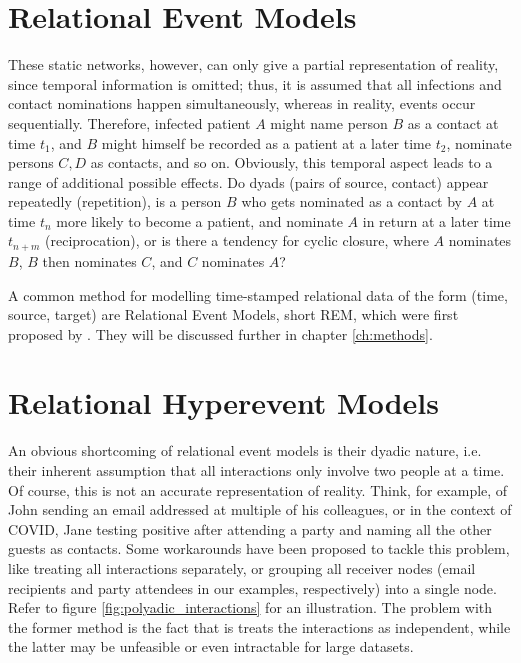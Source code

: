 \section{Relational Event Models}
\label{sec:intro_rem}

These static networks, however, can only give a partial representation of reality, since temporal information is omitted; thus, it is assumed that all infections and contact nominations happen simultaneously, whereas in reality, events occur sequentially. Therefore, infected patient $A$ might name person $B$ as a contact at time $t_1$, and $B$ might himself be recorded as a patient at a later time $t_2$, nominate persons $C,D$ as contacts, and so on. Obviously, this temporal aspect leads to a range of additional possible effects. Do dyads (pairs of source, contact) appear repeatedly (repetition), is a person $B$ who gets nominated as a contact by $A$ at time $t_n$ more likely to become a patient, and nominate $A$ in return at a later time $t_{n+m}$ (reciprocation), or is there a tendency for cyclic closure, where $A$ nominates $B$, $B$ then nominates $C$, and $C$ nominates $A$?

A common method for modelling time-stamped relational data of the form (time, source, target) are Relational Event Models, short REM, which were first proposed by \cite{butts20084}. They will be discussed further in chapter \ref{ch:methods}.

\section{Relational Hyperevent Models}
\label{sec:intro_rhem}

An obvious shortcoming of relational event models is their dyadic nature, i.e. their inherent assumption that all interactions only involve two people at a time. Of course, this is not an accurate representation of reality. Think, for example, of John sending an email addressed at multiple of his colleagues, or in the context of COVID, Jane testing positive after attending a party and naming all the other guests as contacts. Some workarounds have been proposed to tackle this problem, like treating all interactions separately, or grouping all receiver nodes (email recipients and party attendees in our examples, respectively) into a single node. Refer to figure \ref{fig:polyadic_interactions} for an illustration. The problem with the former method is the fact that is treats the interactions as independent, while the latter may be unfeasible or even intractable for large datasets.

